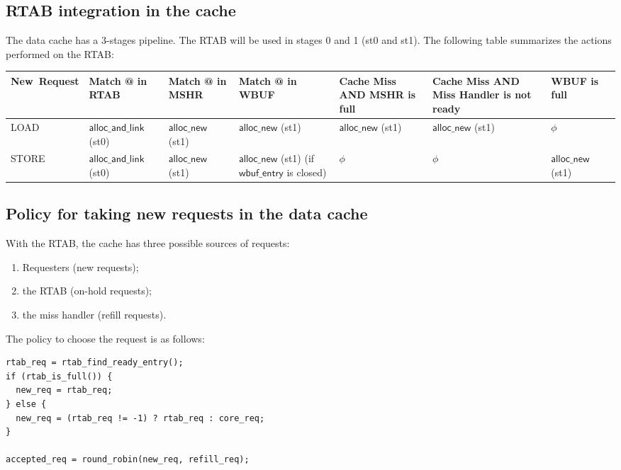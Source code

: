 \documentclass[10pt,titlepage,twoside]{book}
\begin{document}
\subsection{\ac{RTAB} integration in the cache}

The data cache has a 3-stages pipeline.
The \ac{RTAB} will be used in stages 0 and 1 (st0 and st1).
The following table summarizes the actions performed on the \ac{RTAB}:

{\footnotesize%
\begin{tabular}{%
p{.12\linewidth}p{.17\linewidth}p{.11\linewidth}p{.11\linewidth}p{.11\linewidth}p{.11\linewidth}p{.11\linewidth}p{.11\linewidth}}
  \toprule%
  {\bf \mbox{New Request}}
  & {\bf Match @ in \ac{RTAB}}
  & {\bf Match @ in \ac{MSHR}}
  & {\bf Match @ in \ac{WBUF}}
  & {\bf Cache Miss AND \ac{MSHR} is full}
  & {\bf Cache Miss AND Miss Handler is not ready}
  & {\bf \ac{WBUF} is full} \\
  \midrule%
  LOAD
  & $\mathsf{alloc\_and\_link}$ (st0)
  & $\mathsf{alloc\_new}$ (st1)
  & $\mathsf{alloc\_new}$ (st1)
  & $\mathsf{alloc\_new}$ (st1)
  & $\mathsf{alloc\_new}$ (st1)
  & $\phi$ \\
  \midrule%
  STORE
  & $\mathsf{alloc\_and\_link}$ (st0)
  & $\mathsf{alloc\_new}$ (st1)
  & $\mathsf{alloc\_new}$ (st1) (if $\mathsf{wbuf\_entry}$ is closed)
  & $\phi$
  & $\phi$
  & $\mathsf{alloc\_new}$ (st1) \\
  \midrule%
\end{tabular}}

\subsection{Policy for taking new requests in the data cache}

With the \ac{RTAB}, the cache has three possible sources of requests:
\begin{enumerate}
\item Requesters (new requests);
\item the \ac{RTAB} (on-hold requests);
\item the miss handler (refill requests).
\end{enumerate}

The policy to choose the request is as follows:

\begin{lstlisting}
rtab_req = rtab_find_ready_entry();
if (rtab_is_full()) {
  new_req = rtab_req;
} else {
  new_req = (rtab_req != -1) ? rtab_req : core_req;
}

accepted_req = round_robin(new_req, refill_req);
\end{lstlisting}
\end{document}
